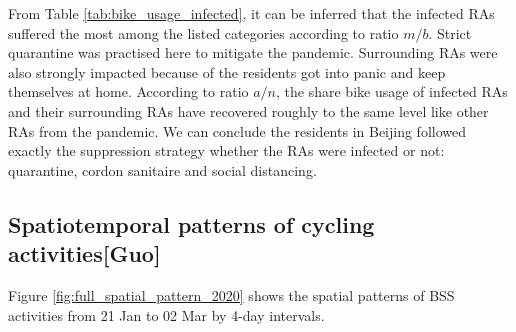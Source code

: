 \documentclass[preprints,ijgi,submit,moreauthors]{Definitions/mdpi}
\begin{document}
From Table \ref{tab:bike_usage_infected}, it can be inferred that the infected RAs suffered the most among the listed categories according to ratio $m/b$.
Strict quarantine was practised here to mitigate the pandemic.
Surrounding RAs were also strongly impacted because of the residents got into panic and keep themselves at home.
According to ratio $a/n$, the share bike usage of infected RAs and their surrounding RAs have recovered roughly to the same level like other RAs from the pandemic.
We can conclude the residents in Beijing followed exactly the suppression strategy whether the RAs were infected or not: quarantine, cordon sanitaire and social distancing.

\subsection{Spatiotemporal patterns of cycling activities\textbf{[Guo]}}

Figure \ref{fig:full_spatial_pattern_2020} shows the spatial patterns of BSS activities from 21 Jan to 02 Mar by 4-day intervals.
\end{document}
